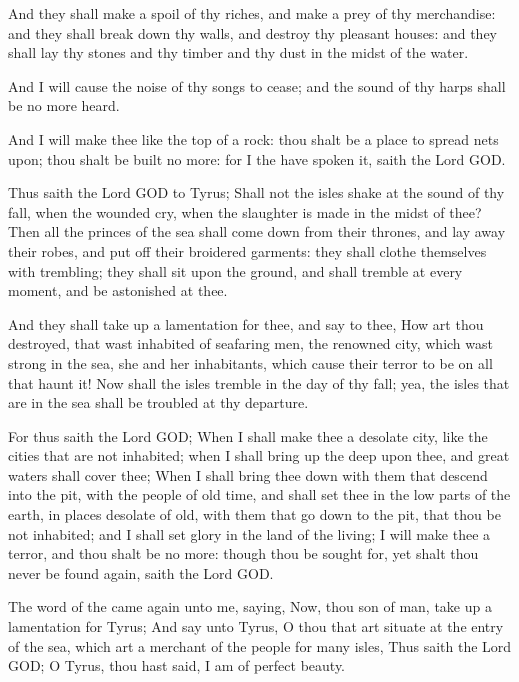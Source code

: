 \Verse And they shall make a spoil of thy riches, and make a prey of thy merchandise: and they shall break down thy walls, and destroy thy pleasant houses: and they shall lay thy stones and thy timber and thy dust in the midst of the water.

\Verse And I will cause the noise of thy songs to cease; and the sound of thy harps shall be no more heard.

\Verse And I will make thee like the top of a rock: thou shalt be a place to spread nets upon; thou shalt be built no more: for I the \LORD have spoken it, saith the Lord GOD.

\Verse Thus saith the Lord GOD to Tyrus; Shall not the isles shake at the sound of thy fall, when the wounded cry, when the slaughter is made in the midst of thee?  \Verse Then all the princes of the sea shall come down from their thrones, and lay away their robes, and put off their broidered garments: they shall clothe themselves with trembling; they shall sit upon the ground, and shall tremble at every moment, and be astonished at thee.

\Verse And they shall take up a lamentation for thee, and say to thee, How art thou destroyed, that wast inhabited of seafaring men, the renowned city, which wast strong in the sea, she and her inhabitants, which cause their terror to be on all that haunt it!  \Verse Now shall the isles tremble in the day of thy fall; yea, the isles that are in the sea shall be troubled at thy departure.

\Verse For thus saith the Lord GOD; When I shall make thee a desolate city, like the cities that are not inhabited; when I shall bring up the deep upon thee, and great waters shall cover thee; \Verse When I shall bring thee down with them that descend into the pit, with the people of old time, and shall set thee in the low parts of the earth, in places desolate of old, with them that go down to the pit, that thou be not inhabited; and I shall set glory in the land of the living; \Verse I will make thee a terror, and thou shalt be no more: though thou be sought for, yet shalt thou never be found again, saith the Lord GOD.


\Chapter
\Verse The word of the \LORD came again unto me, saying, \Verse Now, thou son of man, take up a lamentation for Tyrus; \Verse And say unto Tyrus, O thou that art situate at the entry of the sea, which art a merchant of the people for many isles, Thus saith the Lord GOD; O Tyrus, thou hast said, I am of perfect beauty.

